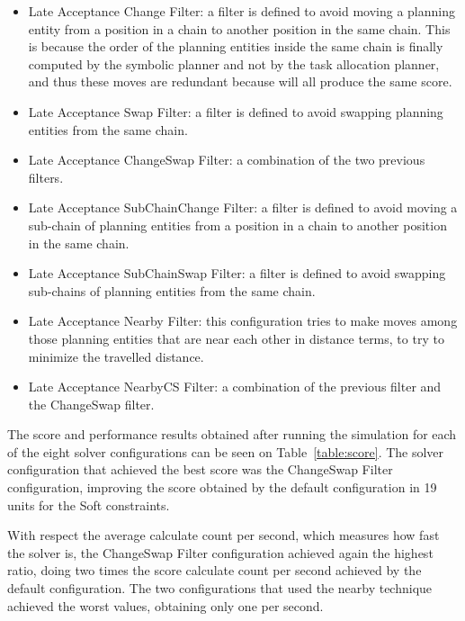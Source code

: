 \documentclass[runningheads,a4paper]{llncs}
\begin{document}
\begin{itemize}
  \item Late Acceptance Change Filter: a filter is defined to avoid moving a planning entity from a position in a chain to another position in the same chain. This is because the order of the planning entities inside the same chain is finally computed by the symbolic planner and not by the task allocation planner, and thus these moves are redundant because will all produce the same score.
  \item Late Acceptance Swap Filter: a filter is defined to avoid swapping planning entities from the same chain.
  \item Late Acceptance ChangeSwap Filter: a combination of the two previous filters.
  \item Late Acceptance SubChainChange Filter: a filter is defined to avoid moving a sub-chain of planning entities from a position in a chain to another position in the same chain.
  \item Late Acceptance SubChainSwap Filter: a filter is defined to avoid swapping sub-chains of planning entities from the same chain.
  \item Late Acceptance Nearby Filter: this configuration tries to make moves among those planning entities that are near each other in distance terms, to try to minimize the travelled distance.
  \item Late Acceptance NearbyCS Filter: a combination of the previous filter and the ChangeSwap filter.
\end{itemize}

The score and performance results obtained after running the simulation for each of the eight solver configurations can be seen on Table~\ref{table:score}. The solver configuration that achieved the best score was the ChangeSwap Filter configuration, improving the score obtained by the default configuration in 19 units for the Soft constraints. 

With respect the average calculate count per second, which measures how fast the solver is, the ChangeSwap Filter configuration achieved again the highest ratio, doing two times the score calculate count per second achieved by the default configuration. The two configurations that used the nearby technique achieved the worst values, obtaining only one per second.
\end{document}
